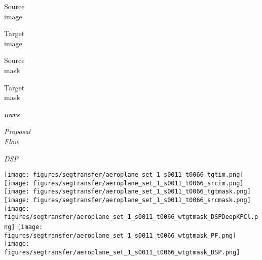 \documentclass[10pt,twocolumn,letterpaper]{article}
\def\methodname{ANet\xspace}
\begin{document}
\begin{figure*}[t]
\scriptsize\newcommand{\segtransferw}{0.12}%
\begin{center}
  \begin{minipage}[c]{\segtransferw\linewidth} \centering
  Source \\ image
  \end{minipage}
  \begin{minipage}[c]{\segtransferw\linewidth} \centering
  Target \\ image
  \end{minipage}
  \begin{minipage}[c]{\segtransferw\linewidth} \centering
  Source \\ mask
  \end{minipage}
  \begin{minipage}[c]{\segtransferw\linewidth} \centering
  Target \\ mask
  \end{minipage}
  \begin{minipage}[c]{\segtransferw\linewidth} \centering
  \textit{\textbf{ours}}
  \end{minipage}
  \begin{minipage}[c]{\segtransferw\linewidth} \centering
  \textit{Proposal \\ Flow}  \cite{ham2016} %
  \end{minipage}
  \begin{minipage}[c]{\segtransferw\linewidth} \centering
  \textit{DSP}  \cite{kim2013deformable} %
  \end{minipage}
  \texttt{[image: figures/segtransfer/aeroplane\_set\_1\_s0011\_t0066\_tgtim.png]}
  \texttt{[image: figures/segtransfer/aeroplane\_set\_1\_s0011\_t0066\_srcim.png]}
  \texttt{[image: figures/segtransfer/aeroplane\_set\_1\_s0011\_t0066\_tgtmask.png]}
  \texttt{[image: figures/segtransfer/aeroplane\_set\_1\_s0011\_t0066\_srcmask.png]}
  \texttt{[image: figures/segtransfer/aeroplane\_set\_1\_s0011\_t0066\_wtgtmask\_DSPDeepKPCl.png]}
  \texttt{[image: figures/segtransfer/aeroplane\_set\_1\_s0011\_t0066\_wtgtmask\_PF.png]}
  \texttt{[image: figures/segtransfer/aeroplane\_set\_1\_s0011\_t0066\_wtgtmask\_DSP.png]}
\\


\end{center}
\end{figure*}
\end{document}
